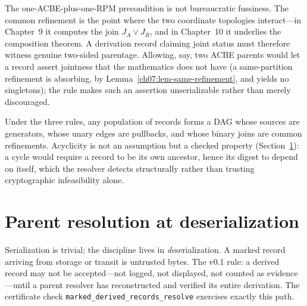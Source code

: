 \begin{remark}\label{ch08:rem-multiset}
The one-ACBE-plus-one-RPM precondition is not bureaucratic fussiness. The common refinement is the point where the two coordinate topologies interact---in Chapter~9 it computes the join $J_{A}\vee J_{R}$, and in Chapter~10 it underlies the composition theorem. A derivation record claiming joint status must therefore witness genuine two-sided parentage. Allowing, say, two ACBE parents would let a record assert jointness that the mathematics does not have (a same-partition refinement is absorbing, by Lemma~\ref{ch07:lem-same-refinement}, and yields no singletons); the rule makes such an assertion unserializable rather than merely discouraged.
\end{remark}

\begin{remark}\label{ch08:rem-dag}
Under the three rules, any population of records forms a DAG whose sources are generators, whose unary edges are pullbacks, and whose binary joins are common refinements. Acyclicity is not an assumption but a checked property (Section~\ref{ch08:sec-resolution}): a cycle would require a record to be its own ancestor, hence its digest to depend on itself, which the resolver detects structurally rather than trusting cryptographic infeasibility alone.
\end{remark}

\section{Parent resolution at deserialization}\label{ch08:sec-resolution}

Serialization is trivial; the discipline lives in \emph{de}serialization. A marked record arriving from storage or transit is untrusted bytes. The v0.1 rule: a derived record may not be accepted---not logged, not displayed, not counted as evidence---until a parent resolver has reconstructed and verified its entire derivation. The certificate check \texttt{marked\_derived\_records\_resolve} exercises exactly this path.

